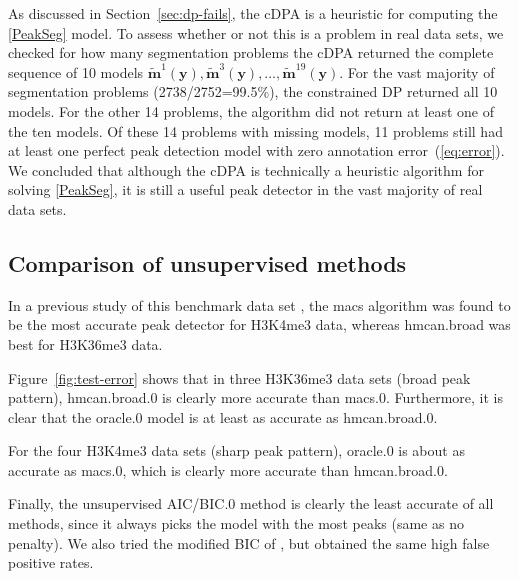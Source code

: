 \documentclass{article}
\begin{document}
As discussed in Section~\ref{sec:dp-fails}, the cDPA is a heuristic
for computing the \ref{PeakSeg} model. To assess whether or not this
is a problem in real data sets, we checked for how many segmentation
problems the cDPA returned the complete sequence of 10 models
$\mathbf{\tilde m}^1(\mathbf y),\mathbf{\tilde m}^3(\mathbf y), \dots,
\mathbf{\tilde m}^{19}(\mathbf y)$. For the vast majority of
segmentation problems (2738/2752=99.5\%), the constrained DP returned
all 10 models. For the other 14 problems, the algorithm did not return
at least one of the ten models. Of these 14 problems with missing
models, 11 problems still had at least one perfect peak detection
model with zero annotation error~(\ref{eq:error}). We concluded that
although the cDPA is technically a heuristic algorithm for
solving \ref{PeakSeg}, it is still a useful peak detector in the vast
majority of real data sets.



\subsection{Comparison of unsupervised methods}

In a previous study of this benchmark data set
\citep{hocking2014visual}, the macs algorithm was found to be the most
accurate peak detector for H3K4me3 data, whereas hmcan.broad was best
for H3K36me3 data.

Figure~\ref{fig:test-error} shows that in three H3K36me3 data sets
(broad peak pattern), hmcan.broad.0 is clearly more accurate than
macs.0. Furthermore, it is clear that the oracle.0 model is at least
as accurate as hmcan.broad.0.

For the four H3K4me3 data sets (sharp peak pattern), oracle.0 is about
as accurate as macs.0, which is clearly more accurate than
hmcan.broad.0.

Finally, the unsupervised AIC/BIC.0 method is clearly the least
accurate of all methods, since it always picks the model with the most
peaks (same as no penalty). We also tried the modified BIC of
\citet{mBIC}, but obtained the same high false positive rates.
\end{document}
